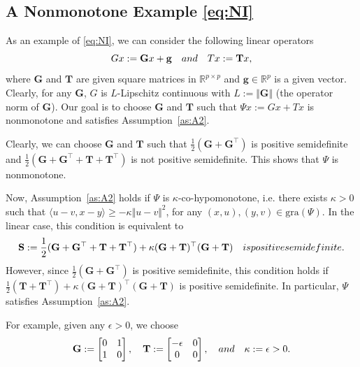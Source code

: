 \documentclass{article}
\newcommand{\R}{\mathbb{R}}
\newcommand{\norms}[1]{\Vert#1\Vert}
\newcommand{\iprods}[1]{\langle #1\rangle}
\newcommand{\gra}[1]{\mathrm{gra}(#1)}
\newcommand{\mbf}[1]{\mathbf{#1}}
\newcommand{\aftersubsec}{\vspace{-1.5ex}}
\theoremstyle{plain}
\theoremstyle{definition}
\theoremstyle{remark}
\begin{document}
\subsection{A Nonmonotone Example \eqref{eq:NI}}\label{apdix:subsec:nonmonotone_examples}
\aftersubsec
As an example of \eqref{eq:NI}, we can consider the following linear operators 
\vspace{-0.5ex}
\begin{equation*}
Gx := \mbf{G}x + \mbf{g} \quad \textrm{and} \quad Tx := \mbf{T}x, 
\vspace{-0.5ex}
\end{equation*}
where $\mbf{G}$ and $\mbf{T}$ are given square matrices in $\R^{p\times p}$ and $\mbf{g} \in\R^p$ is a given vector.
Clearly, for any $\mbf{G}$, $G$ is $L$-Lipschitz continuous with $L := \norms{\mbf{G}}$ (the operator norm of $\mbf{G}$).
Our goal is to choose $\mbf{G}$ and $\mbf{T}$ such that $\Psi{x} := Gx + Tx$ is nonmonotone and satisfies Assumption~\ref{as:A2}.
\begin{compactitem}
\item Clearly, we can choose $\mbf{G}$ and $\mbf{T}$ such that $\frac{1}{2}(\mbf{G} + \mbf{G}^{\top})$ is positive semidefinite and $\frac{1}{2}(\mbf{G}+\mbf{G}^{\top} +\mbf{T} + \mbf{T}^{\top})$ is not positive semidefinite.
This shows that $\Psi$ is nonmonotone.
\item
Now, Assumption~\ref{as:A2} holds if $\Psi$ is $\kappa$-co-hypomonotone, i.e. there exists $\kappa > 0$ such that $\iprods{u - v, x - y} \geq -\kappa\norms{u - v}^2$, for any $(x, u), (y, v) \in \gra{\Psi}$.
In the linear case, this condition is equivalent to
\vspace{-0.5ex}
\begin{equation*}
\mbf{S} := \frac{1}{2}(\mbf{G} + \mbf{G}^{\top} + \mbf{T} + \mbf{T}^{\top}) + \kappa(\mbf{G} + \mbf{T})^{\top}(\mbf{G} + \mbf{T}) \quad \textrm{is positive semidefinite.}
\vspace{-0.5ex}
\end{equation*}
However, since $\frac{1}{2}(\mbf{G} + \mbf{G}^{\top})$ is positive semidefinite, this condition holds if $\frac{1}{2}(\mbf{T} + \mbf{T}^{\top}) + \kappa(\mbf{G} + \mbf{T})^{\top}(\mbf{G} + \mbf{T})$ is positive semidefinite. 
In particular, $\Psi$ satisfies Assumption~\ref{as:A2}.
\end{compactitem}
For example, given any $\epsilon > 0$, we choose 
\vspace{-0.5ex}
\begin{equation*}
\mbf{G} := \begin{bmatrix}0 & 1 \\ 1 & 0\end{bmatrix}, \quad \mbf{T} := \begin{bmatrix}-\epsilon & 0 \\ 0 & 0\end{bmatrix}, \quad \textrm{and} \quad \kappa := \epsilon > 0.
\vspace{-0.5ex}
\end{equation*}
\end{document}
